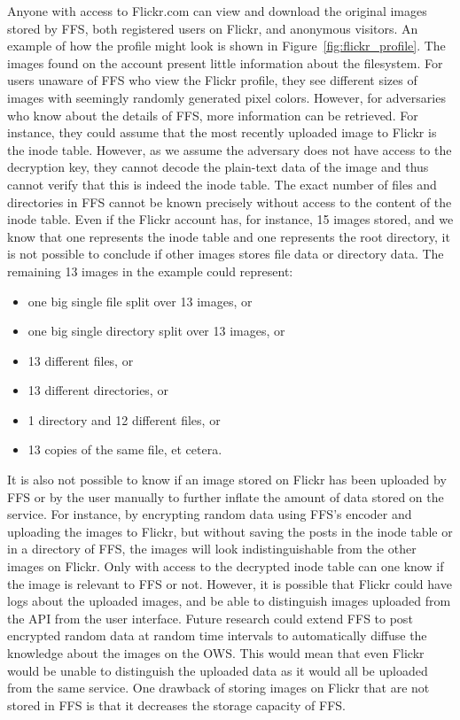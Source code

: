 Anyone with access to Flickr.com can view and download the original images stored by \gls{FFS}, both registered users on Flickr, and anonymous visitors. An example of how the profile might look is shown in Figure~\ref{fig:flickr_profile}. The images found on the account present little information about the filesystem. For users unaware of \gls{FFS} who view the Flickr profile, they see different sizes of images with seemingly randomly generated pixel colors. However, for adversaries who know about the details of \gls{FFS}, more information can be retrieved. For instance, they could assume that the most recently uploaded image to Flickr is the inode table. However, as we assume the adversary does not have access to the decryption key, they cannot decode the \mbox{plain-text} data of the image and thus cannot verify that this is indeed the inode table. The exact number of files and directories in \gls{FFS} cannot be known precisely without access to the content of the inode table. Even if the Flickr account has, for instance, 15 images stored, and we know that one represents the inode table and one represents the root directory, it is not possible to conclude if other images stores file data or directory data. The remaining 13 images in the example could represent:
\begin{itemize}
	\item one big single file split over 13 images, or
	\item one big single directory split over 13 images, or
	\item 13 different files, or
	\item 13 different directories, or
	\item 1 directory and 12 different files, or
	\item 13 copies of the same file, et cetera.
\end{itemize}
It is also not possible to know if an image stored on Flickr has been uploaded by \gls{FFS} or by the user manually to further inflate the amount of data stored on the service. For instance, by encrypting random data using \gls{FFS}'s encoder and uploading the images to Flickr, but without saving the posts in the inode table or in a directory of \gls{FFS}, the images will look indistinguishable from the other images on Flickr. Only with access to the decrypted inode table can one know if the image is relevant to \gls{FFS} or not. However, it is possible that Flickr could have logs about the uploaded images, and be able to distinguish images uploaded from the \gls{API} from the user interface. Future research could extend \gls{FFS} to post encrypted random data at random time intervals to automatically diffuse the knowledge about the images on the \gls{OWS}. This would mean that even Flickr would be unable to distinguish the uploaded data as it would all be uploaded from the same service. One drawback of storing images on Flickr that are not stored in \gls{FFS} is that it decreases the storage capacity of \gls{FFS}.
